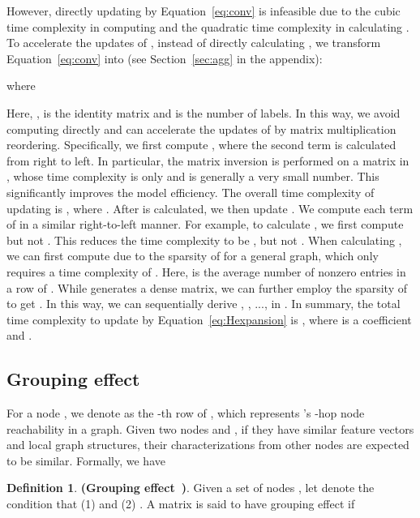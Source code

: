 \documentclass[nohyperref]{article}
\theoremstyle{plain}
\theoremstyle{definition}
\newtheorem{definition}[theorem]{Definition}
\theoremstyle{remark}
\begin{document}
However,
directly updating  by Equation~\ref{eq:conv} is infeasible
due to the cubic time complexity in computing
 and the quadratic time complexity in calculating .
To accelerate the updates of ,
instead of directly calculating ,
we transform Equation~\ref{eq:conv} into (see Section~\ref{sec:agg} in the appendix):
{\begin{scriptsize}

\end{scriptsize}
}
where 
\begin{scriptsize}

\end{scriptsize}
Here,
,  is the identity matrix and  is the number of labels.
In this way,
we avoid computing  directly and can
accelerate the updates of  by matrix multiplication reordering.
Specifically,
we first compute ,
where the second term is calculated from right to left.
In particular,
the matrix inversion
is
performed on a matrix in ,
whose time complexity
is only  and  is generally a very small number.
This significantly improves the model efficiency. 
The overall time complexity of updating  is , where .
After  is calculated,
we  
then update .
We compute each term of  in a similar right-to-left manner.
For example,
to calculate ,
we first compute  but not .
This reduces the time complexity to be , but not .
When calculating ,
we can first compute  due to the sparsity of  for a general graph,
which only requires a time complexity of .
Here,  is the average number of nonzero entries in a row of .
While  generates a dense matrix,
we can further employ the sparsity of  to get .
In this way,
we can sequentially derive , , ...,  in .
In summary,
the total time complexity 
to update  by Equation~\ref{eq:Hexpansion}
is , where  is a coefficient and .




\subsection{Grouping effect}
\label{sec:ge}
For a node ,
we denote  as
the -th row of ,
which represents 's -hop node reachability in a graph.
Given two nodes  and ,
if they have similar feature vectors and local graph structures,
their characterizations from other nodes are expected to be similar.
Formally, we have


\begin{definition}
\textbf{(Grouping effect~\cite{li2020cast})}.
Given a set of nodes ,
let  denote the condition that 
(1) 
and (2) .
A matrix  is said to have grouping effect if 

\end{definition}
\end{document}
